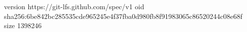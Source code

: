 version https://git-lfs.github.com/spec/v1
oid sha256:6be842bc285535cde965245e4f37fba0d980fb8f91983065c86520244c08e68f
size 1398246
